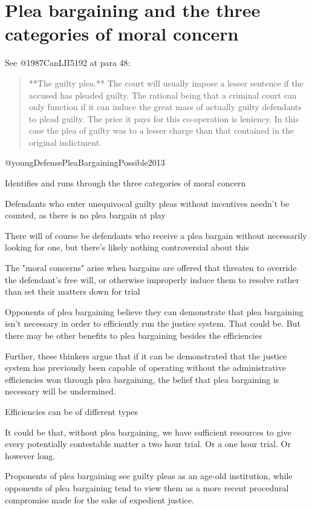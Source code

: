 \section{Plea bargaining and the three categories of moral concern}

See @1987CanLII5192 at para 48:
\begin{quote}
    **The guilty plea.** The court will usually impose a lesser sentence if the accused has pleaded guilty. The rational being that a criminal court can only function if it can induce the great mass of actually guilty defendants to plead guilty. The price it pays for this co-operation is leniency. In this case the plea of guilty was to a lesser charge than that contained in the original indictment.
\end{quote}

@youngDefensePleaBargainingPossible2013

Identifies and runs through the three categories of moral concern

Defendants who enter unequivocal guilty pleas without incentives needn't be counted, as there is no plea bargain at play

There will of course be defendants who receive a plea bargain without necessarily looking for one, but there's likely nothing controversial about this

The "moral concerns" arise when bargains are offered that threaten to override the defendant's free will, or otherwise improperly induce them to resolve rather than set their matters down for trial

Opponents of plea bargaining believe they can demonstrate that plea bargaining isn't necessary in order to efficiently run the justice system. That could be. But there may be other benefits to plea bargaining besides the efficiencies

Further, these thinkers argue that if it can be demonstrated that the justice system has previously been capable of operating without the administrative efficiencies won through plea bargaining, the belief that plea bargaining is necessary will be undermined.

Efficiencies can be of different types

It could be that, without plea bargaining, we have sufficient resources to give every potentially contestable matter a two hour trial. Or a one hour trial. Or however long.

Proponents of plea bargaining see guilty pleas as an age-old institution, while opponents of plea bargaining tend to view them as a more recent procedural compromise made for the sake of expedient justice.

